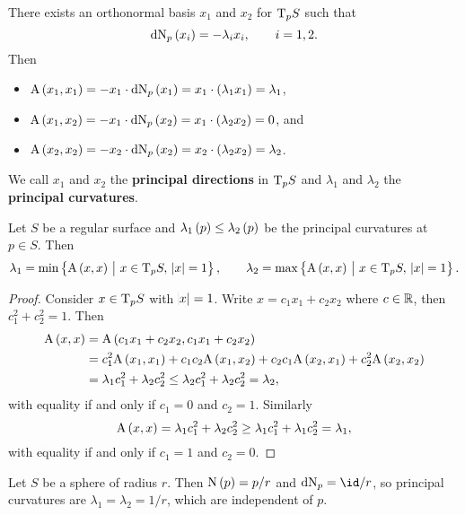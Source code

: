 
There exists an orthonormal basis $ x_1 $ and $ x_2 $ for $ \mathrm{T}_p S $ such that
$$ \d\N_p\br{x_i} = -\lambda_ix_i, \qquad i = 1, 2. $$
Then
\begin{itemize}
\item $ \A\br{x_1, x_1} = -x_1 \cdot \d\N_p\br{x_1} = x_1 \cdot \br{\lambda_1x_1} = \lambda_1 $,
\item $ \A\br{x_1, x_2} = -x_1 \cdot \d\N_p\br{x_2} = x_1 \cdot \br{\lambda_2x_2} = 0 $, and
\item $ \A\br{x_2, x_2} = -x_2 \cdot \d\N_p\br{x_2} = x_2 \cdot \br{\lambda_2x_2} = \lambda_2 $.
\end{itemize}
We call $ x_1 $ and $ x_2 $ the \textbf{principal directions} in $ \mathrm{T}_p S $ and $ \lambda_1 $ and $ \lambda_2 $ the \textbf{principal curvatures}.

\begin{lemma}
Let $ S $ be a regular surface and $ \lambda_1\br{p} \le \lambda_2\br{p} $ be the principal curvatures at $ p \in S $. Then
$$ \lambda_1 = \min\cbr{\A\br{x, x} \st x \in \T_p S, \ \abs{x} = 1}, \qquad \lambda_2 = \max\cbr{\A\br{x, x} \st x \in \T_p S, \ \abs{x} = 1}. $$
\end{lemma}

\begin{proof}
Consider $ x \in \mathrm{T}_p S $ with $ \abs{x} = 1 $. Write $ x = c_1x_1 + c_2x_2 $ where $ c \in \mathbb{R} $, then $ c_1^2 + c_2^2 = 1 $. Then
\begin{align*}
\A\br{x, x}
& = \A\br{c_1x_1 + c_2x_2, c_1x_1 + c_2x_2} \\
& = c_1^2\A\br{x_1, x_1} + c_1c_2\A\br{x_1, x_2} + c_2c_1\A\br{x_2, x_1} + c_2^2\A\br{x_2, x_2} \\
& = \lambda_1c_1^2 + \lambda_2c_2^2
\le \lambda_2c_1^2 + \lambda_2c_2^2
= \lambda_2,
\end{align*}
with equality if and only if $ c_1 = 0 $ and $ c_2 = 1 $. Similarly
$$ \A\br{x, x} = \lambda_1c_1^2 + \lambda_2c_2^2 \ge \lambda_1c_1^2 + \lambda_1c_2^2 = \lambda_1, $$
with equality if and only if $ c_1 = 1 $ and $ c_2 = 0 $.
\end{proof}

\begin{example*}
Let $ S $ be a sphere of radius $ r $. Then $ \N\br{p} = p / r $ and $ \d\N_p = \id / r $, so principal curvatures are $ \lambda_1 = \lambda_2 = 1 / r $, which are independent of $ p $.
\end{example*}

